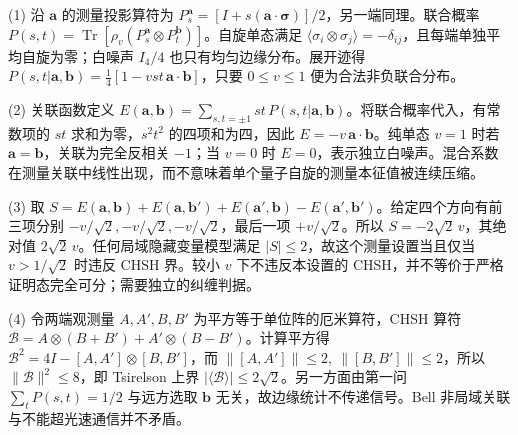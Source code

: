 (1) 沿 \(\mathbf a\) 的测量投影算符为 \(P_s^{\mathbf a}=[I+s(\mathbf a\cdot\boldsymbol\sigma)]/2\)，另一端同理。联合概率 \(P(s,t)=\operatorname{Tr}[\rho_v(P_s^{\mathbf a}\otimes P_t^{\mathbf b})]\)。自旋单态满足 \(\langle\sigma_i\otimes\sigma_j\rangle=-\delta_{ij}\)，且每端单独平均自旋为零；白噪声 \(I_4/4\) 也只有均匀边缘分布。展开迹得 \(P(s,t|\mathbf a,\mathbf b)=\frac14[1-vst\,\mathbf a\cdot\mathbf b]\)，只要 \(0\le v\le1\) 便为合法非负联合分布。

(2) 关联函数定义 \(E(\mathbf a,\mathbf b)=\sum_{s,t=\pm1}st\,P(s,t|\mathbf a,\mathbf b)\)。将联合概率代入，有常数项的 \(st\) 求和为零，\(s^2t^2\) 的四项和为四，因此 \(E=-v\,\mathbf a\cdot\mathbf b\)。纯单态 \(v=1\) 时若 \(\mathbf a=\mathbf b\)，关联为完全反相关 \(-1\)；当 \(v=0\) 时 \(E=0\)，表示独立白噪声。混合系数在测量关联中线性出现，而不意味着单个量子自旋的测量本征值被连续压缩。

(3) 取 \(S=E(\mathbf a,\mathbf b)+E(\mathbf a,\mathbf b')+E(\mathbf a',\mathbf b)-E(\mathbf a',\mathbf b')\)。给定四个方向有前三项分别 \(-v/\sqrt2,-v/\sqrt2,-v/\sqrt2\)，最后一项 \(+v/\sqrt2\)。所以 \(S=-2\sqrt2\,v\)，其绝对值 \(2\sqrt2\,v\)。任何局域隐藏变量模型满足 \(|S|\le2\)，故这个测量设置当且仅当 \(v>1/\sqrt2\) 时违反 CHSH 界。较小 \(v\) 下不违反本设置的 CHSH，并不等价于严格证明态完全可分；需要独立的纠缠判据。

(4) 令两端观测量 \(A,A',B,B'\) 为平方等于单位阵的厄米算符，CHSH 算符 \(\mathcal B=A\otimes(B+B')+A'\otimes(B-B')\)。计算平方得 \(\mathcal B^2=4I-[A,A']\otimes[B,B']\)，而 \(\|[A,A']\|\le2,\ \|[B,B']\|\le2\)，所以 \(\|\mathcal B\|^2\le8\)，即 Tsirelson 上界 \(|\langle\mathcal B\rangle|\le2\sqrt2\)。另一方面由第一问 \(\sum_tP(s,t)=1/2\) 与远方选取 \(\mathbf b\) 无关，故边缘统计不传递信号。Bell 非局域关联与不能超光速通信并不矛盾。

